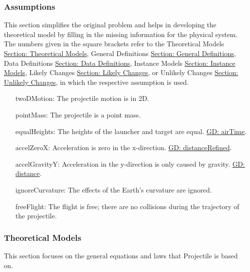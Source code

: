 \documentclass[12pt]{article}
\begin{document}
\subsubsection{Assumptions}
\label{Sec:Assumps}
This section simplifies the original problem and helps in developing the theoretical model by filling in the missing information for the physical system. The numbers given in the square brackets refer to the Theoretical Models \hyperref[Sec:TMs]{Section: Theoretical Models}, General Definitions \hyperref[Sec:GDs]{Section: General Definitions}, Data Definitions \hyperref[Sec:DDs]{Section: Data Definitions}, Instance Models \hyperref[Sec:IMs]{Section: Instance Models}, Likely Changes \hyperref[Sec:LCs]{Section: Likely Changes}, or Unlikely Changes \hyperref[Sec:UCs]{Section: Unlikely Changes}, in which the respective assumption is used.
\begin{itemize}
\item[twoDMotion:\phantomsection\label{twoDMotion}]The projectile motion is in 2D.
\item[pointMass:\phantomsection\label{pointMass}]The projectile is a point mass.
\item[equalHeights:\phantomsection\label{equalHeights}]The heights of the launcher and target are equal. \hyperref[GD:airTime]{GD: airTime}.
\item[accelZeroX:\phantomsection\label{accelZeroX}]Acceleration is zero in the x-direction. \hyperref[GD:distanceRefined]{GD: distanceRefined}.
\item[accelGravityY:\phantomsection\label{accelGravityY}]Acceleration in the y-direction is only caused by gravity. \hyperref[GD:distance]{GD: distance}.
\item[ignoreCurvature:\phantomsection\label{ignoreCurvature}]The effects of the Earth's curvature are ignored.
\item[freeFlight:\phantomsection\label{freeFlight}]The flight is free; there are no collisions during the trajectory of the projectile.
\end{itemize}
\subsubsection{Theoretical Models}
\label{Sec:TMs}
This section focuses on the general equations and laws that Projectile is based on.
\par~
\end{document}
